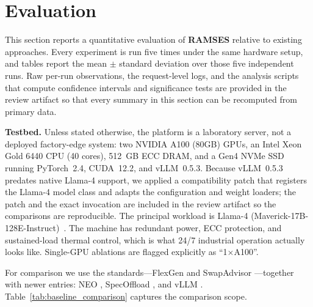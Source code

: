 \section{Evaluation}\label{sec:results}

This section reports a quantitative evaluation of \textbf{RAMSES} relative to existing approaches.
Every experiment is run five times under the same hardware setup, and tables report the mean $\pm$ standard deviation over those five independent runs.
Raw per-run observations, the request-level logs, and the analysis scripts that compute confidence intervals and significance tests are provided in the review artifact so that every summary in this section can be recomputed from primary data.

\noindent\textbf{Testbed.}
Unless stated otherwise, the platform is a laboratory server, not a deployed factory-edge system:
two NVIDIA A100 (80GB) GPUs, an Intel Xeon Gold 6440 CPU (40 cores),
512~GB ECC DRAM, and a Gen4 NVMe SSD running PyTorch~2.4, CUDA~12.2,
and vLLM~0.5.3. Because vLLM~0.5.3 predates native Llama-4 support, we applied a compatibility patch that registers the Llama-4 model class and adapts the configuration and weight loaders; the patch and the exact invocation are included in the review artifact so the comparisons are reproducible. The principal workload is Llama-4 (Maverick-17B-128E-Instruct)~\cite{meta2025llama4}. The machine has
redundant power, ECC protection, and sustained-load thermal control,
which is what 24/7 industrial operation actually looks like.
Single-GPU ablations are flagged explicitly as ``1$\times$A100''.

For comparison we use the standards---FlexGen \cite{sheng2023flexgen} and SwapAdvisor \cite{swapAdvisor2020}---together with newer entries: NEO \cite{jiang2024neo}, SpecOffload \cite{zhuge2025specoffload}, and vLLM \cite{kwon2023pagedattention}.
Table~\ref{tab:baseline_comparison} captures the comparison scope.



